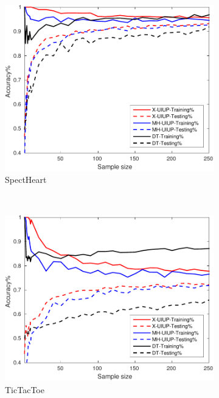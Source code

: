 \begin{figure}[ht]
\begin{subfigure}[b]{0.3\textwidth}
		\centering
  	\includegraphics[width=\textwidth]{figs/PLPTF/Trees/SpectHeartDownsampledFurther_Trees_X_MH.pdf}
  	\caption{SpectHeart}
		\label{fig:S1}
	\end{subfigure}
  \\
  \begin{subfigure}[b]{0.3\textwidth}
		\centering
  	\includegraphics[width=\textwidth]{figs/PLPTF/Trees/TicTacToe_Trees_X_MH.pdf}
  	\caption{TicTacToe}
		\label{fig:T1}
	\end{subfigure}
  \begin{subfigure}[b]{0.3\textwidth}
		\centering

\end{subfigure}
\end{figure}
